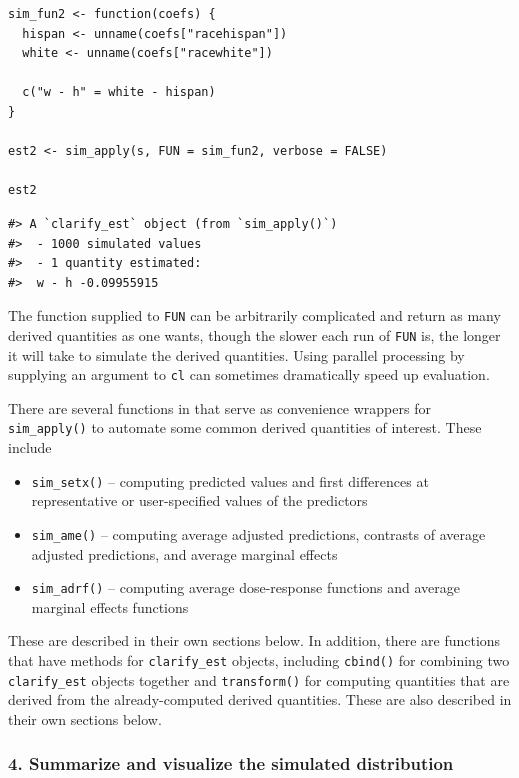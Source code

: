 \begin{verbatim}
sim_fun2 <- function(coefs) {
  hispan <- unname(coefs["racehispan"])
  white <- unname(coefs["racewhite"])
  
  c("w - h" = white - hispan)
}

est2 <- sim_apply(s, FUN = sim_fun2, verbose = FALSE)

est2
\end{verbatim}

\begin{verbatim}
#> A `clarify_est` object (from `sim_apply()`)
#>  - 1000 simulated values
#>  - 1 quantity estimated:                  
#>  w - h -0.09955915
\end{verbatim}

The function supplied to \texttt{FUN} can be arbitrarily complicated and return as many derived quantities as one wants, though the slower each run of \texttt{FUN} is, the longer it will take to simulate the derived quantities. Using parallel processing by supplying an argument to \texttt{cl} can sometimes dramatically speed up evaluation.

There are several functions in  that serve as convenience wrappers for \texttt{sim\_apply()} to automate some common derived quantities of interest. These include

\begin{itemize}
\item
  \texttt{sim\_setx()} -- computing predicted values and first differences at representative or user-specified values of the predictors
\item
  \texttt{sim\_ame()} -- computing average adjusted predictions, contrasts of average adjusted predictions, and average marginal effects
\item
  \texttt{sim\_adrf()} -- computing average dose-response functions and average marginal effects functions
\end{itemize}

These are described in their own sections below. In addition, there are functions that have methods for \texttt{clarify\_est} objects, including \texttt{cbind()} for combining two \texttt{clarify\_est} objects together and \texttt{transform()} for computing quantities that are derived from the already-computed derived quantities. These are also described in their own sections below.

\hypertarget{summarize-and-visualize-the-simulated-distribution}{%
\subsubsection{4. Summarize and visualize the simulated distribution}\label{summarize-and-visualize-the-simulated-distribution}}

